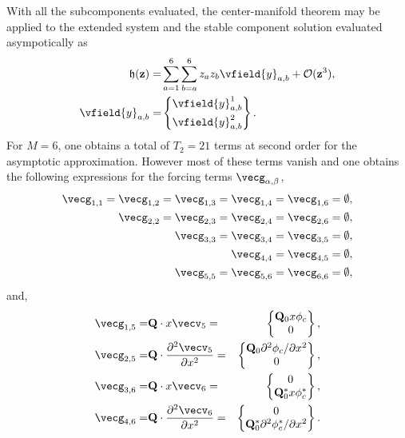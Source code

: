 With all the subcomponents evaluated, the center-manifold theorem may be applied to the extended system and the stable component solution evaluated asympotically as
\begin{align}
	\label{eqn:GL_asymptotic}
		\mathfrak{h}(\mathbf{z}) =& \sum_{a=1}^{6}\sum_{b=a}^{6} z_{a}z_{b}\vfield{y}_{a,b}
		 + \mathcal{O}(\mathbf{z}^{3}), \nonumber \\
		 \vfield{y}_{a,b} =& \begin{Bmatrix}
		 	\vfield{y}^{1}_{a,b} \vspace{1mm} \\
		 	\vfield{y}^{2}_{a,b}
		 \end{Bmatrix}.	\nonumber
\end{align}
For $M=6$, one obtains a total of $T_{2}=21$ terms at second order for the asymptotic approximation. However most of these terms vanish and one obtains the following expressions for the forcing terms $\vecg_{\alpha,\beta}$,
\begin{align}
	\vecg_{1,1}  = \vecg_{1,2} = \vecg_{1,3}  = \vecg_{1,4} = \vecg_{1,6} = \emptyset, \nonumber \\
	\vecg_{2,2} = \vecg_{2,3} = \vecg_{2,4} = \vecg_{2,6} = \emptyset, \nonumber \\
	\vecg_{3,3} = \vecg_{3,4} = \vecg_{3,5} = \emptyset, \nonumber \\
	\vecg_{4,4} = \vecg_{4,5} = \emptyset, \nonumber \\
	\vecg_{5,5} = \vecg_{5,6} = \vecg_{6,6} = \emptyset, \nonumber
\end{align}
and,
\begin{align}
	\vecg_{1,5} =& 	\mathbf{Q}\cdot x\vecv_{5} =&
	\begin{Bmatrix}
		\mathbf{Q}_{0}x\phi_{c} \\
		0
	\end{Bmatrix}, \nonumber \\
	\vecg_{2,5} =& 	\mathbf{Q}\cdot \dfrac{\partial^{2}\vecv_{5}}{\partial x^{2}} =&
	\begin{Bmatrix}
		\mathbf{Q}_{0}\partial^{2}\phi_{c}/\partial x^{2}	\\
		0
	\end{Bmatrix}, \nonumber \\
	\vecg_{3,6} =& 	\mathbf{Q}\cdot x\vecv_{6} =&
	\begin{Bmatrix}
		0	\\
		\mathbf{Q}^{*}_{0}x\phi^{*}_{c}
	\end{Bmatrix}, \nonumber \\
	\vecg_{4,6} =& 	\mathbf{Q}\cdot \dfrac{\partial^{2}\vecv_{6}}{\partial x^{2}} =&
	\begin{Bmatrix}
		0	\\
		\mathbf{Q}^{*}_{0}\partial^{2}\phi^{*}_{c}/\partial x^{2}
	\end{Bmatrix}. \nonumber
\end{align}
